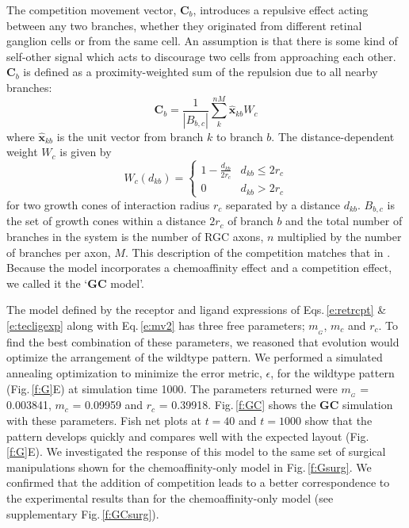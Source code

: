 \documentclass[11pt, a4paper, draft]{article}
\begin{document}
%
The competition movement vector, $\mathbf{C}_b$, introduces a repulsive effect
acting between any two branches, whether they originated from different
retinal ganglion cells or from the same cell. An assumption is that there is
some kind of self-other signal which acts to discourage two cells from
approaching each other. $\mathbf{C}_b$ is defined as a proximity-weighted sum
of the repulsion due to all nearby branches:
%
\begin{equation} \label{e:C}
\mathbf{C}_b = \frac{1}{|B_{b,c}|} \sum_k^{nM} \hat{\mathbf{x}}_{kb} W_c
\end{equation}
where $\hat{\mathbf{x}}_{kb}$ is the unit vector from branch $k$ to branch
$b$. The distance-dependent weight $W_c$ is given by
\begin{equation}
W_c(d_{kb}) = \begin{cases}
      1 - \frac{d_{kb}}{2r_c}   & d_{kb} \leq 2r_c \\
     0 & d_{kb} > 2r_c
     \end{cases}
\end{equation}
for two growth cones of interaction radius $r_c$ separated by a distance
$d_{kb}$. $B_{b,c}$ is the set of growth cones within a distance $2r_c$ of
branch $b$ and the total number of branches in the system is the number of RGC
axons, $n$ multiplied by the number of branches per axon, $M$. This
description of the competition matches that
in \citet{simpson_simple_2011}. Because the model incorporates a chemoaffinity
effect and a competition effect, we called it the `$\mathbf{GC}$ model'.

The model defined by the receptor and ligand expressions of Eqs.\,\ref{e:retrcpt}
\& \ref{e:tecligexp} along with Eq.\,\ref{e:mv2} has three
free parameters; $m_{\!_G}$, $m_c$ and $r_c$. To find the best combination of
these parameters, we reasoned that evolution would optimize the arrangement of
the wildtype pattern. We performed a simulated annealing optimization to
minimize the error metric, $\epsilon$, for the wildtype pattern
(Fig.\,\ref{f:G}E) at simulation time 1000. The parameters returned were
$m_{\!_G}$ = 0.003841, $m_c$ = 0.09959 and $r_c$ = 0.39918. Fig.\,\ref{f:GC}
shows the $\mathbf{GC}$ simulation with these parameters. Fish net plots at
$t=40$ and $t=1000$ show that the pattern develops quickly and compares well
with the expected layout (Fig.\,\ref{f:G}E). We investigated the response of
this model to the same set of surgical manipulations shown for the
chemoaffinity-only model in Fig.\,\ref{f:Gsurg}. We confirmed that the
addition of competition leads to a better correspondence to the experimental
results than for the chemoaffinity-only model (see supplementary
Fig.\,\ref{f:GCsurg}).
\end{document}

